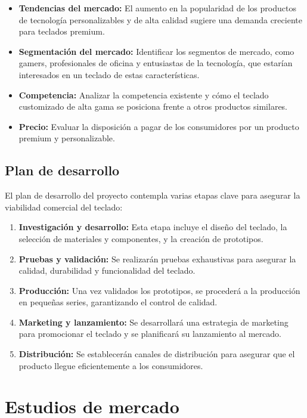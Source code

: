 \begin{itemize}
    \item \textbf{Tendencias del mercado:} El aumento en la popularidad de los productos de tecnología personalizables y de alta calidad sugiere una demanda creciente para teclados premium.
    \item \textbf{Segmentación del mercado:} Identificar los segmentos de mercado, como gamers, profesionales de oficina y entusiastas de la tecnología, que estarían interesados en un teclado de estas características.
    \item \textbf{Competencia:} Analizar la competencia existente y cómo el teclado customizado de alta gama se posiciona frente a otros productos similares.
    \item \textbf{Precio:} Evaluar la disposición a pagar de los consumidores por un producto premium y personalizable.
\end{itemize}

\subsection{Plan de desarrollo}

El plan de desarrollo del proyecto contempla varias etapas clave para asegurar la viabilidad comercial del teclado:

\begin{enumerate}
    \item \textbf{Investigación y desarrollo:} Esta etapa incluye el diseño del teclado, la selección de materiales y componentes, y la creación de prototipos.
    \item \textbf{Pruebas y validación:} Se realizarán pruebas exhaustivas para asegurar la calidad, durabilidad y funcionalidad del teclado.
    \item \textbf{Producción:} Una vez validados los prototipos, se procederá a la producción en pequeñas series, garantizando el control de calidad.
    \item \textbf{Marketing y lanzamiento:} Se desarrollará una estrategia de marketing para promocionar el teclado y se planificará su lanzamiento al mercado.
    \item \textbf{Distribución:} Se establecerán canales de distribución para asegurar que el producto llegue eficientemente a los consumidores.
\end{enumerate}

\section{Estudios de mercado}

